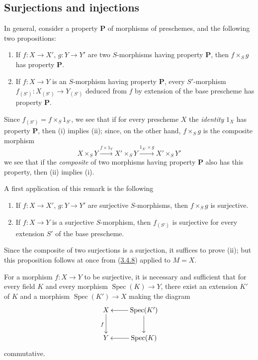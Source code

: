 \subsection{Surjections and injections}
\label{subsection:I.3.5}

\begin{env}[3.5.1]
\label{I.3.5.1}
In general, consider a property $\mathbf{P}$ of morphisms of
preschemes, and the following two propositions:
\begin{enumerate}
  \item[(i)] If $f:X\to X'$, $g:Y\to Y'$ are two $S$-morphisms having
  property $\mathbf{P}$, then $f\times_S g$ has property $\mathbf{P}$.
  \item[(ii)] If $f:X\to Y$ is an $S$-morphism having property
  $\mathbf{P}$, every $S'$-morphism $f_{(S')}:X_{(S')}\to Y_{(S')}$ deduced
  from $f$ by extension of the base prescheme has property
  $\mathbf{P}$.
\end{enumerate}

Since $f_{(S')}=f\times_S 1_{S'}$, we see that if for every prescheme $X$
the \emph{identity} $1_X$ has property $\mathbf{P}$, then (i) implies
(ii); since, on the other hand, $f\times_S g$ is the composite morphism
\label{I.3.5.1.product-composition}
\[
  X\times_S Y\xrightarrow{f\times 1_Y}X'\times_S Y
  \xrightarrow{1_{X'}\times g}X'\times_S Y'
\]
we see that if the \emph{composite} of two morphisms having property
$\mathbf{P}$ also has this property, then (ii) implies (i).
\end{env}

A first application of this remark is the following

\begin{proposition}[3.5.2]
\label{I.3.5.2}
\begin{enumerate}
  \item[(i)] If $f:X\to X'$, $g:Y\to Y'$ are surjective $S$-morphisms,
  then $f\times_S g$ is surjective.
  \item[(ii)] If $f:X\to Y$ is a surjective $S$-morphism, then $f_{(S')}$ is
  surjective for every extension $S'$ of the base prescheme.
\end{enumerate}
\end{proposition}

Since the composite of two surjections is a surjection, it suffices to prove
(ii); but this proposition follows at once from
(\hyperref[I.3.4.8]{3.4.8}) applied to $M=X$.

\begin{proposition}[3.5.3]
\label{I.3.5.3}
For a morphism $f:X\to Y$ to be surjective, it is necessary and sufficient
that for every field $K$ and every morphism $\operatorname{Spec}(K)\to Y$,
there exist an extension $K'$ of $K$ and a morphism
$\operatorname{Spec}(K')\to X$ making the diagram
\label{I.3.5.3.surjectivity-diagram}
\[
  \xymatrix{
    X\ar[d]_f & \operatorname{Spec}(K')\ar[l]\ar[d]\\
    Y & \operatorname{Spec}(K)\ar[l]
  }
\]
commutative.
\end{proposition}

